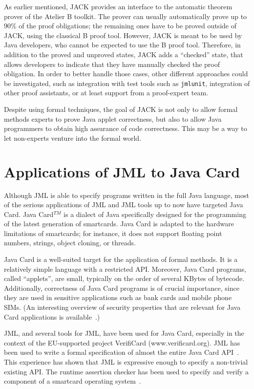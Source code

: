 \documentclass{entcs}
\begin{document}
As earlier mentioned, JACK provides an interface to the automatic
theorem prover of the Atelier B toolkit. The prover can usually
automatically prove up to 90\% of the proof obligations; the remaining
ones have to be proved outside of JACK, using the classical B proof
tool.  However, JACK is meant to be used by Java developers, who
cannot be expected to use the B proof tool.  Therefore, in addition to
the proved and unproved states, JACK adds a ``checked'' state, that
allows developers to indicate that they have manually checked the
proof obligation. In order to better handle those cases, other different
approaches could be investigated, such as integration with test
tools such as {\tt jmlunit}, integration of other proof assistants, or
at least support from a proof-expert team.

Despite using formal techniques, the goal of JACK is not only to allow
formal methods experts to prove Java applet correctness, but also to
allow Java programmers to obtain high assurance of code correctness.
This may be a way to let non-experts venture into the formal world.

\section{Applications of JML to Java Card}
\label{applications}

Although JML is able to specify programs written in the full Java language,
most of the serious applications of JML and JML tools up to now
have targeted Java Card.  Java Card$^{TM}$ is a dialect of Java specifically
designed for the programming of the latest generation of smartcards.
Java Card is adapted to the hardware limitations of smartcards; for
instance, it does not support floating point numbers, strings, object
cloning, or threads.

Java Card is a well-suited target for the application of formal
methods.  It is a relatively simple language with a restricted API\@.
Moreover, Java Card programs, called ``applets'', are small, typically
on the order of several KBytes of bytecode.  Additionally, correctness
of Java Card programs is of crucial importance, since they are used in
sensitive applications such as bank cards and mobile phone SIMs.  (An
interesting overview of security properties that are relevant for Java
Card applications is available~\cite{MarletLM01}.)

JML, and several tools for JML, have been used for Java Card,
especially in the context of the EU-supported project VerifiCard
(www.verificard.org).  JML has been used to write a formal
specification of almost the entire Java Card
API~\cite{PollBergJacobs01}.  This experience has shown that JML is
expressive enough to specify a non-trivial existing API\@.  The
runtime assertion checker has been used to specify and verify a
component of a smartcard operating system~\cite{PollHarteldeJong02}.
\end{document}
